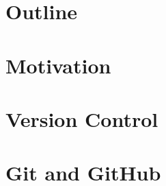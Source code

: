 \documentclass[10pt,t,xcolor=table]{UWMadBeamer}
\date{5/12/2014}
\begin{document}
\begin{frame}
    \titlepage
\end{frame}


\section*{Outline}
\begin{frame}
    \tableofcontents
\end{frame}



\section{Motivation}
\section{Version Control}
\section{Git and GitHub}
    
\end{document}
